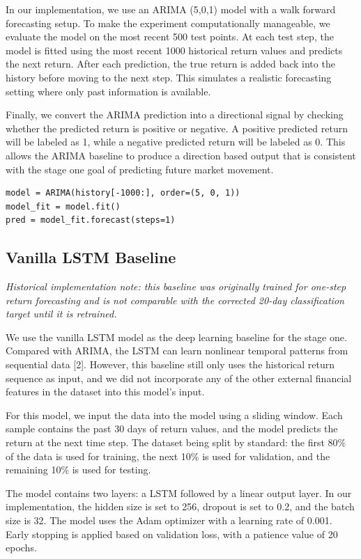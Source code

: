 \documentclass{article}
\begin{document}
In our implementation, we use an ARIMA (5,0,1) model with a walk forward forecasting setup. To make the experiment computationally manageable, we evaluate the model on the most recent 500 test points. At each test step, the model is fitted using the most recent 1000 historical return values and predicts the next return. After each prediction, the true return is added back into the history before moving to the next step. This simulates a realistic forecasting setting where only past information is available.

Finally, we convert the ARIMA prediction into a directional signal by checking whether the predicted return is positive or negative. A positive predicted return will be labeled as 1, while a negative predicted return will be labeled as 0. This allows the ARIMA baseline to produce a direction based output that is consistent with the stage one goal of predicting future market movement.

\begin{verbatim}
model = ARIMA(history[-1000:], order=(5, 0, 1))
model_fit = model.fit()
pred = model_fit.forecast(steps=1)
\end{verbatim}

\subsection{Vanilla LSTM Baseline}

\textit{Historical implementation note: this baseline was originally trained for one-step return forecasting and is not comparable with the corrected 20-day classification target until it is retrained.}

We use the vanilla LSTM model as the deep learning baseline for the stage one. Compared with ARIMA, the LSTM can learn nonlinear temporal patterns from sequential data [2]. However, this baseline still only uses the historical return sequence as input, and we did not incorporate any of the other external financial features in the dataset into this model's input.

For this model, we input the data into the model using a sliding window. Each sample contains the past 30 days of return values, and the model predicts the return at the next time step. The dataset being split by standard: the first 80\% of the data is used for training, the next 10\% is used for validation, and the remaining 10\% is used for testing.

The model contains two layers: a LSTM followed by a linear output layer. In our implementation, the hidden size is set to 256, dropout is set to 0.2, and the batch size is 32. The model uses the Adam optimizer with a learning rate of 0.001. Early stopping is applied based on validation loss, with a patience value of 20 epochs.
\end{document}
